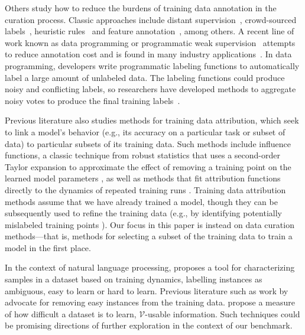 Others study how to reduce the burdens of training data annotation in the curation process. Classic approaches include distant supervision~\cite{hoffmann2011knowledge}, crowd-sourced labels~\cite{yuen2011survey}, heuristic rules~\cite{Awasthi2020Learning} and feature annotation~\cite{mann2010generalized}, among others. A recent line of work known as data programming or programmatic weak supervision~\cite{Ratner16,ratner2017snorkel,zhang2021wrench,zhang2022survey} attempts to reduce annotation cost and is found in many industry applications~\cite{bach2019snorkel,Overton}. In data programming, developers write programmatic labeling functions to automatically label a large amount of unlabeled data. The labeling functions could produce noisy and conflicting labels, so researchers have developed methods to aggregate noisy votes to produce the final training labels~\cite{Ratner19,fu2020fast,shin2021universalizing}.

Previous literature also studies methods for training data attribution, which seek to link a model's behavior (e.g., its accuracy on a particular task or subset of data) to particular subsets of its training data. 
Such methods include influence functions, a classic technique from robust statistics \citep{hampel1974influence,cook1977detection} that uses a second-order Taylor expansion to approximate the effect of removing a training point on the learned model parameters
\citep{koh2017understanding,koh2019accuracy,han2020explaining,guo2020fastif}, as well as methods that fit attribution functions directly to the dynamics of repeated training runs \citep{ghorbani2019data,pruthi2020estimating,ilyas2022datamodels,guu2023simfluence}.
Training data attribution methods assume that we have already trained a model, though they can be subsequently used to refine the training data (e.g., by identifying potentially mislabeled training points \citep{koh2017understanding}).
Our focus in this paper is instead on data curation methods---that is, methods for selecting a subset of the training data to train a model in the first place.

In the context of natural language processing, \citet{dataset-cartography} proposes a tool for characterizing samples in a dataset based on training dynamics, labelling instances as ambiguous, easy to learn or hard to learn. Previous literature such as work by \citet{le2020adversarial,li2019repair,gururangan-etal-2018-annotation} advocate for removing easy instances from the training data. 
\citet{ethayarajh2022understanding} propose a measure of how difficult a dataset is to learn, $\mathcal{V}$-usable information. Such techniques could be promising directions of further exploration in the context of our benchmark.

